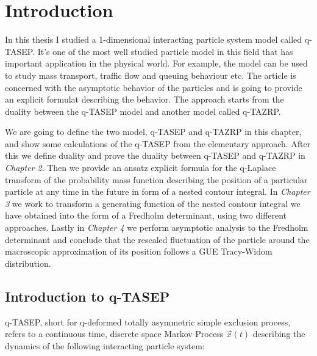 \chapter{Introduction}
In this thesis I studied a 1-dimensional interacting particle system model called q-TASEP. It's one of the most well studied particle model in this field that has important application in the physical world. For example, the model can be used to study mass transport, traffic flow and queuing behaviour etc. The article is concerned with the asymptotic behavior of the particles and is going to provide an explicit formulat describing the behavior. The approach starts from the duality between the q-TASEP model and another model called q-TAZRP. 

We are going to define the two model, q-TASEP and q-TAZRP in this chapter, and show some calculations of the q-TASEP from the elementary approach. After this we define duality and prove the duality between q-TASEP and q-TAZRP in \textit{Chapter 2}. Then we provide an ansatz explicit formula for the q-Laplace transform of the probability mass function describing the position of a particular particle at any time in the future in form of a nested contour integral. In \textit{Chapter 3} we work to transform a generating function of the nested contour integral we have obtained into the form of a Fredholm determinant, using two different approaches. Lastly in \textit{Chapter 4} we perform asymptotic analysis to the Fredholm determinant and conclude that the rescaled fluctuation of the particle around the macroscopic approximation of its position follows a GUE Tracy-Widom distribution.

\section{Introduction to q-TASEP}
\label{sec:intro-qtasep}

q-TASEP, short for q-deformed totally asymmetric simple exclusion process, refers to a continuous time, discrete space Markov Process $\vec{x}(t)$ describing the dynamics of the following interacting particle system:

